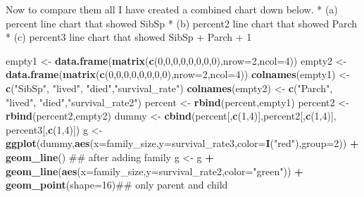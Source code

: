 \documentclass[]{article}
\newenvironment{Shaded}{\begin{snugshade}}{\end{snugshade}}
\newcommand{\KeywordTok}[1]{\textcolor[rgb]{0.13,0.29,0.53}{\textbf{#1}}}
\newcommand{\DataTypeTok}[1]{\textcolor[rgb]{0.13,0.29,0.53}{#1}}
\newcommand{\DecValTok}[1]{\textcolor[rgb]{0.00,0.00,0.81}{#1}}
\newcommand{\StringTok}[1]{\textcolor[rgb]{0.31,0.60,0.02}{#1}}
\newcommand{\OperatorTok}[1]{\textcolor[rgb]{0.81,0.36,0.00}{\textbf{#1}}}
\newcommand{\NormalTok}[1]{#1}
\begin{document}
Now to compare them all I have created a combined chart down below. *
(a) percent line chart that showed SibSp * (b) percent2 line chart that
showed Parch * (c) percent3 line chart that showed SibSp + Parch + 1

\begin{Shaded}
\begin{Highlighting}[]
\NormalTok{empty1 <-}\StringTok{ }\KeywordTok{data.frame}\NormalTok{(}\KeywordTok{matrix}\NormalTok{(}\KeywordTok{c}\NormalTok{(}\DecValTok{0}\NormalTok{,}\DecValTok{0}\NormalTok{,}\DecValTok{0}\NormalTok{,}\DecValTok{0}\NormalTok{,}\DecValTok{0}\NormalTok{,}\DecValTok{0}\NormalTok{,}\DecValTok{0}\NormalTok{,}\DecValTok{0}\NormalTok{),}\DataTypeTok{nrow=}\DecValTok{2}\NormalTok{,}\DataTypeTok{ncol=}\DecValTok{4}\NormalTok{))}
\NormalTok{empty2 <-}\StringTok{ }\KeywordTok{data.frame}\NormalTok{(}\KeywordTok{matrix}\NormalTok{(}\KeywordTok{c}\NormalTok{(}\DecValTok{0}\NormalTok{,}\DecValTok{0}\NormalTok{,}\DecValTok{0}\NormalTok{,}\DecValTok{0}\NormalTok{,}\DecValTok{0}\NormalTok{,}\DecValTok{0}\NormalTok{,}\DecValTok{0}\NormalTok{,}\DecValTok{0}\NormalTok{),}\DataTypeTok{nrow=}\DecValTok{2}\NormalTok{,}\DataTypeTok{ncol=}\DecValTok{4}\NormalTok{))}
\KeywordTok{colnames}\NormalTok{(empty1) <-}\StringTok{ }\KeywordTok{c}\NormalTok{(}\StringTok{"SibSp"}\NormalTok{, }\StringTok{"lived"}\NormalTok{, }\StringTok{"died"}\NormalTok{,}\StringTok{"survival_rate"}\NormalTok{)}
\KeywordTok{colnames}\NormalTok{(empty2) <-}\StringTok{ }\KeywordTok{c}\NormalTok{(}\StringTok{"Parch"}\NormalTok{, }\StringTok{"lived"}\NormalTok{, }\StringTok{"died"}\NormalTok{,}\StringTok{"survival_rate2"}\NormalTok{)}
\NormalTok{percent <-}\StringTok{ }\KeywordTok{rbind}\NormalTok{(percent,empty1)}
\NormalTok{percent2 <-}\StringTok{ }\KeywordTok{rbind}\NormalTok{(percent2,empty2)}
\NormalTok{dummy <-}\StringTok{ }\KeywordTok{cbind}\NormalTok{(percent[,}\KeywordTok{c}\NormalTok{(}\DecValTok{1}\NormalTok{,}\DecValTok{4}\NormalTok{)],percent2[,}\KeywordTok{c}\NormalTok{(}\DecValTok{1}\NormalTok{,}\DecValTok{4}\NormalTok{)], percent3[,}\KeywordTok{c}\NormalTok{(}\DecValTok{1}\NormalTok{,}\DecValTok{4}\NormalTok{)])}
\NormalTok{g <-}\StringTok{ }\KeywordTok{ggplot}\NormalTok{(dummy,}\KeywordTok{aes}\NormalTok{(}\DataTypeTok{x=}\NormalTok{family_size,}\DataTypeTok{y=}\NormalTok{survival_rate3,}\DataTypeTok{color=}\KeywordTok{I}\NormalTok{(}\StringTok{"red"}\NormalTok{),}\DataTypeTok{group=}\DecValTok{2}\NormalTok{)) }\OperatorTok{+}\StringTok{ }\KeywordTok{geom_line}\NormalTok{() ## after adding family}
\NormalTok{g <-}\StringTok{ }\NormalTok{g }\OperatorTok{+}\StringTok{ }\KeywordTok{geom_line}\NormalTok{(}\KeywordTok{aes}\NormalTok{(}\DataTypeTok{x=}\NormalTok{family_size,}\DataTypeTok{y=}\NormalTok{survival_rate2,}\DataTypeTok{color=}\StringTok{"green"}\NormalTok{)) }\OperatorTok{+}\StringTok{ }\KeywordTok{geom_point}\NormalTok{(}\DataTypeTok{shape=}\DecValTok{16}\NormalTok{)## only parent and child}

\end{Highlighting}
\end{Shaded}
\end{document}
